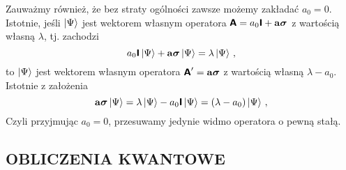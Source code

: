 \documentclass{myclass}
\begin{document}
\begin{itemize}
    Zauważmy również, że bez straty ogólności zawsze możemy zakładać \(a_0=0\). Istotnie, jeśli
    \(\ket{\Psi}\) jest wektorem własnym operatora \(\boldsymbol{\mathsf{A}} =
    a_0\boldsymbol{\mathsf{I}}+\mathbf{a}\boldsymbol{\sigma}\) z wartością własną \(\lambda\), tj. zachodzi
    \begin{equation*}
        a_0\boldsymbol{\mathsf{I}}\ket{\Psi}+\mathbf{a}\boldsymbol{\sigma}\ket{\Psi} = \lambda\ket{\Psi}\,,
    \end{equation*}
    to \(\ket{\Psi}\) jest wektorem własnym operatora \(\boldsymbol{\mathsf{A}}' =
    \mathbf{a}\boldsymbol{\sigma}\) z wartością własną \(\lambda-a_0\). Istotnie z założenia
    \begin{equation*}
        \mathbf{a}\boldsymbol{\sigma}\ket{\Psi} = \lambda\ket{\Psi} - a_0\boldsymbol{\mathsf{I}}\ket{\Psi} = (\lambda-a_0)\ket{\Psi}\,,
    \end{equation*}
    Czyli przyjmując \(a_0 = 0\), przesuwamy jedynie widmo operatora o pewną stałą.

\end{itemize}


\subsection{OBLICZENIA KWANTOWE}





%
%
%
%
%
%
%
%
%
%
\end{document}
